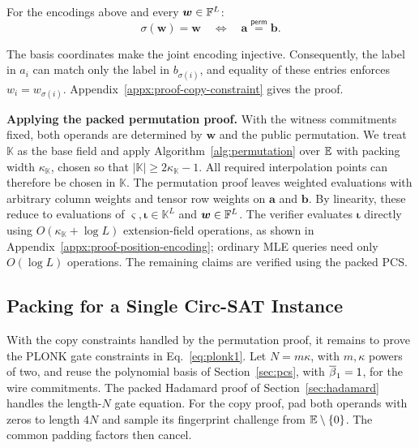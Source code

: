 \begin{lemma}
\label{eq:permutation}
For the encodings above and every \(\bm w\in{\mathbb{F}}^L\):
\[
    \sigma(\bm w)=\bm w
    \quad\Longleftrightarrow\quad
    \bm a\stackrel{\mathsf{perm}}{=}\bm b.
\]
\end{lemma}

The basis coordinates make the joint encoding injective.
Consequently, the label in \(a_i\) can match only the label in
\(b_{\sigma(i)}\), and equality of these entries enforces
\(w_i=w_{\sigma(i)}\).
Appendix~\ref{appx:proof-copy-constraint} gives the proof.

\smallskip\noindent\textbf{Applying the packed permutation proof.}
With the witness commitments fixed, both operands are determined
by \(\bm w\) and the public permutation.
We treat \(\mathbb K\) as the base field and apply
Algorithm~\ref{alg:permutation} over \(\mathbb{E}\)
with packing width \(\kappa_{\mathbb K}\), chosen so that
\(|\mathbb K|\geq2\kappa_{\mathbb K}-1\).
All required interpolation points can therefore be chosen
in \(\mathbb K\).
The permutation proof leaves weighted evaluations with arbitrary
column weights and tensor row weights on \(\bm a\) and \(\bm b\).
By linearity, these reduce to evaluations of
\(\bm\varsigma,\bm\iota\in\mathbb K^L\) and
\(\bm w\in{\mathbb{F}}^L\).
The verifier evaluates \(\bm\iota\) directly using
\(O(\kappa_{\mathbb K}+\log L)\) extension-field operations,
as shown in Appendix~\ref{appx:proof-position-encoding}; ordinary
MLE queries need only \(O(\log L)\) operations.
The remaining claims are verified using the packed PCS.

\subsection{Packing for a Single Circ-SAT Instance}
\label{sec:plonk-packing}

With the copy constraints handled by the permutation proof,
it remains to prove the PLONK gate constraints in Eq.~\eqref{eq:plonk1}.
Let \(N=m\kappa\), with \(m,\kappa\) powers of two, and
reuse the polynomial basis of Section~\ref{sec:pcs}, with
\(\overline{\beta}_1=1\), for the wire commitments.
The packed Hadamard proof of Section~\ref{sec:hadamard}
handles the length-\(N\) gate equation.
For the copy proof, pad both operands with zeros to length
\(4N\) and sample its fingerprint challenge from
\(\mathbb{E}\setminus\{0\}\).
The common padding factors then cancel.

